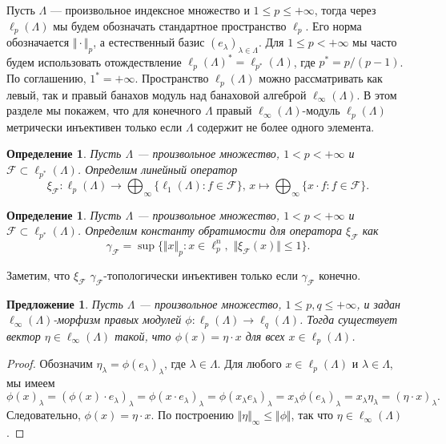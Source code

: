 \documentclass[12pt]{article}
\newtheorem{proposition}[theorem]{Предложение}
\newtheorem{definition}[theorem]{Определение}
\begin{document}
Пусть $\Lambda$ --- произвольное индексное множество 
и $1\leq p\leq +\infty$, тогда через $\ell_p(\Lambda)$ мы будем обозначать 
стандартное пространство $\ell_p$. Его норма обозначается $\Vert\cdot\Vert_p$, а 
естественный базис $(e_\lambda)_{\lambda\in\Lambda}$. 
Для $1\leq p<+\infty$ мы часто будем использовать отождествление
$\ell_p(\Lambda)^*=\ell_{p^*}(\Lambda)$, где $p^*=p/(p-1)$. 
По соглашению, $1^*=+\infty$. Пространство $\ell_p(\Lambda)$ можно рассматривать 
как левый, так и правый банахов модуль над банаховой 
алгеброй $\ell_\infty(\Lambda)$. В этом разделе мы покажем, что для 
конечного $\Lambda$ правый $\ell_\infty(\Lambda)$-модуль $\ell_p(\Lambda)$ 
метрически инъективен только если $\Lambda$ содержит не более одного элемента.

\begin{definition}\label{StdEmbd} 
    Пусть $\Lambda$ --- произвольное множество, $1<p<+\infty$ 
    и $\mathcal{F}\subset\ell_{p^*}(\Lambda)$. Определим линейный оператор
    \[
        \xi_{\mathcal{F}}: 
        \ell_p(\Lambda)\to\bigoplus_\infty\{\ell_1(\Lambda):f\in\mathcal{F}\},\,
        x \mapsto \bigoplus_\infty\{ x\cdot f: f\in\mathcal{F}\}.
    \]
\end{definition}

\begin{definition}\label{StdEmbdCoercv}
    Пусть $\Lambda$ --- произвольное множество, $1<p<+\infty$ 
    и $\mathcal{F}\subset \ell_{p^*}(\Lambda)$. Определим константу 
    обратимости для оператора $\xi_{\mathcal{F}}$ как
    \[
        \gamma_{\mathcal{F}}=\sup\{
            \Vert x\Vert_p: 
            x\in\ell_p^n,\,\, \Vert \xi_{\mathcal{F}}(x)\Vert\leq 1
        \}.
    \]
\end{definition}

Заметим, что $\xi_{\mathcal{F}}$ $\gamma_{\mathcal{F}}$-топологически инъективен 
только если $\gamma_{\mathcal{F}}$ конечно.

\begin{proposition}\label{LinfnMorphlpntolqnCharac}
    Пусть $\Lambda$ --- произвольное множество, $1\leq p,q\leq +\infty$, 
    и задан $\ell_\infty(\Lambda)$-морфизм правых модулей 
    $\phi:\ell_p(\Lambda)\to \ell_{q}(\Lambda)$. Тогда существует 
    вектор $\eta\in\ell_\infty(\Lambda)$ такой, что $\phi(x)=\eta\cdot x$ 
    для всех $x\in \ell_p(\Lambda)$.
\end{proposition}
\begin{proof}
    Обозначим $\eta_\lambda=\phi(e_\lambda)_\lambda$, где $\lambda\in\Lambda$. 
    Для любого $x\in\ell_p(\Lambda)$ и $\lambda\in\Lambda$, мы имеем
    \[
        \phi(x)_\lambda
        =(\phi(x)\cdot e_\lambda)_\lambda
        =\phi(x\cdot e_\lambda)_\lambda
        =\phi(x_\lambda e_\lambda)_\lambda
        =x_\lambda\phi(e_\lambda)_\lambda
        =x_\lambda\eta_\lambda
        =(\eta\cdot x)_\lambda.
    \]
    Следовательно, $\phi(x)=\eta\cdot x$. По 
    построению $\Vert\eta\Vert_\infty\leq\Vert\phi\Vert$, 
    так что $\eta\in\ell_\infty(\Lambda)$.
\end{proof}
\end{document}

